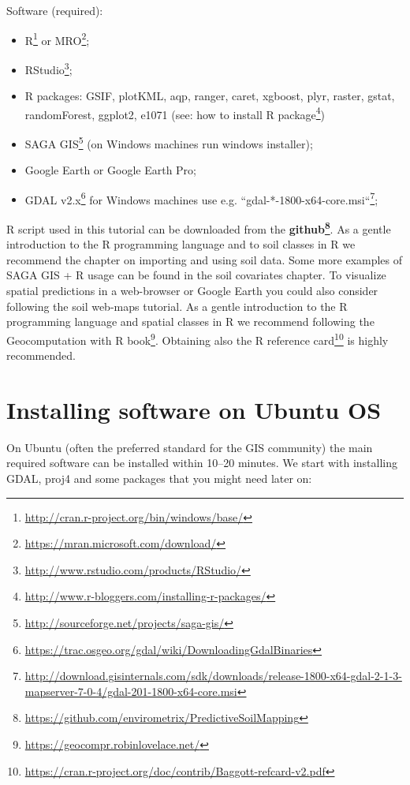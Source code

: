 \documentclass[graybox,natbib,nospthms,UStrade]{svmono}
\renewcommand{\href}[2]{#2 (\url{#1})}
\renewcommand{\href}[2]{#2\footnote{\url{#1}}}
\begin{document}
Software (required):

\begin{itemize}
\item
  \href{http://cran.r-project.org/bin/windows/base/}{R} or \href{https://mran.microsoft.com/download/}{MRO};
\item
  \href{http://www.rstudio.com/products/RStudio/}{RStudio};
\item
  R packages: GSIF, plotKML, aqp, ranger, caret, xgboost, plyr, raster, gstat, randomForest, ggplot2, e1071 (see: \href{http://www.r-bloggers.com/installing-r-packages/}{how to install R package})
\item
  \href{http://sourceforge.net/projects/saga-gis/}{SAGA GIS} (on Windows machines run windows installer);
\item
  Google Earth or Google Earth Pro;
\item
  \href{https://trac.osgeo.org/gdal/wiki/DownloadingGdalBinaries}{GDAL v2.x} for Windows machines use e.g. \href{http://download.gisinternals.com/sdk/downloads/release-1800-x64-gdal-2-1-3-mapserver-7-0-4/gdal-201-1800-x64-core.msi}{``gdal-*-1800-x64-core.msi``};
\end{itemize}

R script used in this tutorial can be downloaded from the \textbf{\href{https://github.com/envirometrix/PredictiveSoilMapping}{github}}. As a gentle introduction to the R programming language and to soil classes in R we recommend the chapter on importing and using soil data. Some more examples of SAGA GIS + R usage can be found in the soil covariates chapter. To visualize spatial predictions in a web-browser or Google Earth you could also consider following the soil web-maps tutorial. As a gentle introduction to the R programming language and spatial classes in R we recommend following \href{https://geocompr.robinlovelace.net/}{the Geocomputation with R book}. Obtaining also the \href{https://cran.r-project.org/doc/contrib/Baggott-refcard-v2.pdf}{R reference card} is highly recommended.

\hypertarget{installing-software-on-ubuntu-os}{%
\section{Installing software on Ubuntu OS}\label{installing-software-on-ubuntu-os}}

On Ubuntu (often the preferred standard for the GIS community) the main required software can be installed within 10--20 minutes. We start with installing GDAL, proj4 and some packages that you might need later on:
\end{document}
